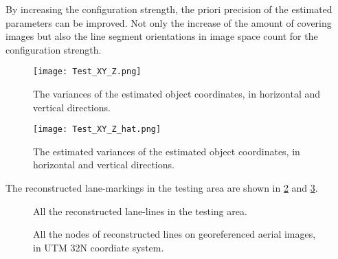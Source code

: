 By increasing the configuration strength, the priori precision of the estimated parameters can be improved. {Not only the increase of the amount of covering images but also the line segment orientations in image space count for the configuration strength}.

\begin{figure}
  \centering
  \texttt{[image: Test\_XY\_Z.png]}
  \caption{\small The variances of the estimated object coordinates, in horizontal and vertical directions.}
  \label{fig:TestSigmxx}
  \vspace{0.5cm}
  \centering
  \texttt{[image: Test\_XY\_Z\_hat.png]}
  \caption{\small The estimated variances of the estimated object coordinates, in horizontal and vertical directions.}
  \label{fig:TestSigmxxhat}
\end{figure}

The reconstructed lane-markings in the testing area are shown in \cref{fig:TestAll3D} and \cref{fig:TestAll2D}. 

\begin{figure}
	\centering
	
	\caption{\small All the reconstructed lane-lines in the testing area.}
	\label{fig:TestAll3D}
\end{figure}

\begin{figure}
	\centering
	
	
	\caption{\small All the nodes of reconstructed lines on georeferenced aerial images, in UTM 32N coordiate system.}
	\label{fig:TestAll2D}
\end{figure}

